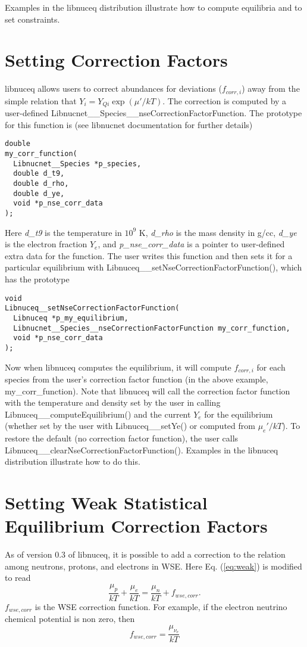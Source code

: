 \documentclass{article}    %
\begin{document}
Examples in the libnuceq distribution illustrate how to compute equilibria
and to set constraints.

\section{Setting Correction Factors}

libnuceq allows users to correct abundances for deviations ($f_{corr,i}$)
away from the simple relation that $Y_i = Y_{Qi}\exp(\mu'/kT)$.
The correction is computed by a user-defined
Libnucnet\_\_Species\_\_nseCorrectionFactorFunction.  The prototype
for this function is (see libnucnet documentation for further details)
\begin{verbatim}
double
my_corr_function(
  Libnucnet__Species *p_species,
  double d_t9,
  double d_rho,
  double d_ye,
  void *p_nse_corr_data
);
\end{verbatim}
Here {\em d\_t9} is the temperature in $10^9$ K, {\em d\_rho}
is the mass density
in g/cc, {\em d\_ye} is the electron fraction $Y_e$, and
{\em p\_nse\_corr\_data}
is a pointer to user-defined extra data for the function.  The user
writes this function and then sets it for a particular equilibrium with
Libnuceq\_\_setNseCorrectionFactorFunction(), which has the prototype
\begin{verbatim}
void
Libnuceq__setNseCorrectionFactorFunction(
  Libnuceq *p_my_equilibrium,
  Libnucnet__Species__nseCorrectionFactorFunction my_corr_function,
  void *p_nse_corr_data
);
\end{verbatim}
Now when libnuceq computes the equilibrium, it will compute $f_{corr,i}$
for each species from the user's correction factor function (in the
above example, my\_corr\_function).  Note that libnuceq will call
the correction factor function with the temperature and density set
by the user in calling Libnuceq\_\_computeEquilibrium() and the
current $Y_e$ for the equilibrium (whether set by the user with
Libnuceq\_\_setYe() or computed from $\mu_e'/kT$).  To restore the default
(no correction factor function), the user calls
Libnuceq\_\_clearNseCorrectionFactorFunction().  Examples in the
libnuceq distribution illustrate how to do this.

\section{Setting Weak Statistical Equilibrium Correction Factors}

As of version 0.3 of libnuceq, it is possible to add a correction to the
relation among neutrons, protons, and electrons in WSE.
Here Eq. (\ref{eq:weak}) is modified to read
\begin{equation}
\frac{\mu_p}{kT} + \frac{\mu_e}{kT} = \frac{\mu_n}{kT} + f_{wse,corr}.
\label{eq:weak_modified}
\end{equation}
$f_{wse,corr}$ is the WSE correction function.  For example, if the
electron neutrino chemical potential is non zero, then
\begin{equation}
f_{wse,corr} = \frac{\mu_{\nu_e}}{kT}
\label{eq:mu_nue}
\end{equation}
\end{document}
